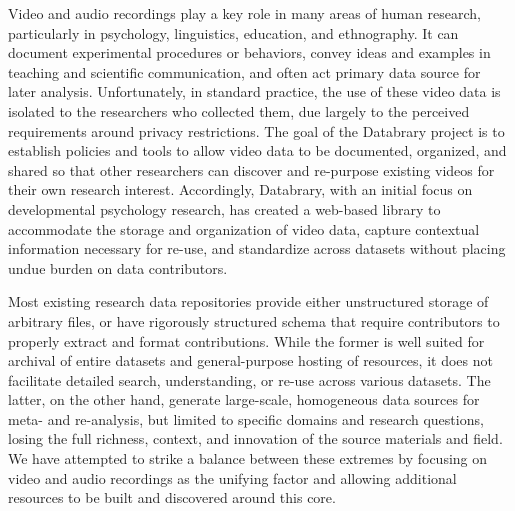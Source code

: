 \documentclass{sig-alternate}
\begin{document}

Video and audio recordings play a key role in many areas of human research, particularly in psychology, linguistics, education, and ethnography.
It can document experimental procedures or behaviors, convey ideas and examples in teaching and scientific communication, and often act primary data source for later analysis.
Unfortunately, in standard practice, the use of these video data is isolated to the researchers who collected them, due largely to the perceived requirements around privacy restrictions.
The goal of the Databrary project is to establish policies and tools to allow video data to be documented, organized, and shared so that other researchers can discover and re-purpose existing videos for their own research interest.
Accordingly, Databrary, with an initial focus on developmental psychology research, has created a web-based library to accommodate the storage and organization of video data, capture contextual information necessary for re-use, and standardize across datasets without placing undue burden on data contributors.

Most existing research data repositories provide either unstructured storage of arbitrary files, or have rigorously structured schema that require contributors to properly extract and format contributions.
While the former is well suited for archival of entire datasets and general-purpose hosting of resources, it does not facilitate detailed search, understanding, or re-use across various datasets.
The latter, on the other hand, generate large-scale, homogeneous data sources for meta- and re-analysis, but limited to specific domains and research questions, losing the full richness, context, and innovation of the source materials and field.
We have attempted to strike a balance between these extremes by focusing on video and audio recordings as the unifying factor and allowing additional resources to be built and discovered around this core.
\end{document}
